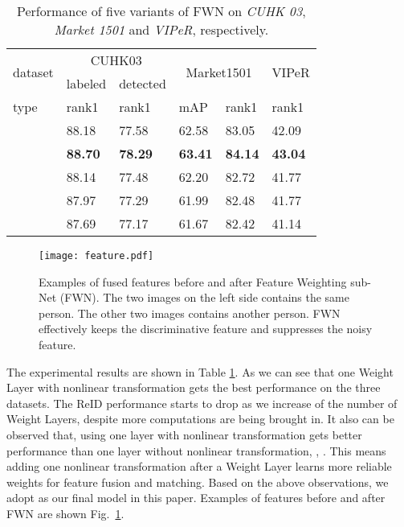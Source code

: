 \documentclass[10pt,twocolumn,letterpaper]{article}
\begin{document}
\begin{table}
\caption{Performance of five variants of FWN on \emph{CUHK 03}, \emph{Market 1501} and \emph{VIPeR}, respectively.}
\vspace{-2mm}
\footnotesize
\begin{center}
\begin{tabular}{|p{1.5cm}<{\centering}|p{0.8cm}<{\centering}|p{0.8cm}<{\centering}|p{0.8cm}<{\centering}|p{0.8cm}<{\centering}|p{0.8cm}<{\centering}|}
\hline
\multirow{2}{*}{dataset}& \multicolumn{2}{c|}{CUHK03}&\multicolumn{2}{c|}{\multirow{2}{*}{Market1501}}&\multirow{2}{*}{VIPeR}\\
\cline{2-3}
           &labeled      &detected    &\multicolumn{2}{c|}{}&\\
 \hline
type &rank1        &rank1       &mAP         &rank1        &rank1\\
\hline
    &88.18	     &77.58       &62.58       &83.05        &42.09\\
    &{\bf 88.70}  &{\bf78.29}  &{\bf63.41}  &{\bf84.14}   &{\bf43.04}\\
    &88.14        &77.48       &62.20       &82.72        &41.77\\
    &87.97        &77.29       &61.99       &82.48        &41.77\\
    &87.69        &77.17       &61.67       &82.42        &41.14\\
\hline
\end{tabular}
\end{center}
\vspace{-6mm}
\label{table:weight}
\end{table}

\begin{figure}[t]
\centering \texttt{[image: feature.pdf]}\\
\caption{Examples of fused features before and after Feature Weighting sub-Net (FWN). The two images on the left side contains the same person. The other two images contains another person. FWN effectively keeps the discriminative feature and suppresses the noisy feature.}
\label{fig:weight}
\vspace{-5mm}
\end{figure}

The experimental results are shown in Table \ref{table:weight}. As we can see that one Weight Layer with nonlinear transformation gets the best performance on the three datasets. The ReID performance starts to drop as we increase of the number of Weight Layers, despite more computations are being brought in. It also can be observed that, using one layer with nonlinear transformation gets better performance than one layer without nonlinear transformation, \ie, . This means adding one nonlinear transformation after a Weight Layer learns more reliable weights for feature fusion and matching. Based on the above observations, we adopt  as our final model in this paper. Examples of features before and after FWN are shown Fig.~\ref{fig:weight}.
\end{document}
